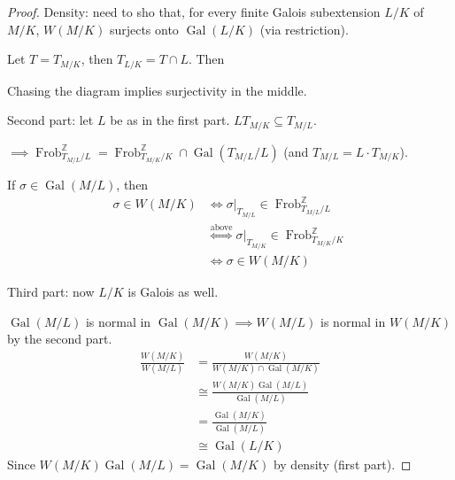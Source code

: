 \documentclass[a4paper]{article}
\theoremstyle{definition}
\theoremstyle{default}
\theoremstyle{remark}
\DeclareMathOperator{\Gal}{Gal}
\DeclareMathOperator{\Frob}{Frob}
\begin{document}
\begin{proof}
	Density: need to sho that,
	for every finite Galois subextension $L/K$ of $M/K$,
	$W(M/K)$ surjects onto $\Gal(L/K)$ (via restriction).
	
	Let $T = T_{M/K}$, then $T_{L/K} = T \cap L$. Then
	\begin{center}
	\end{center}
	Chasing the diagram implies surjectivity in the middle.
	
	Second part: let $L$ be as in the first part.
	$L T_{M/K} \subseteq T_{M/L}$.
	
	\begin{center}
	\end{center}
	$\implies \Frob^\mathbb{Z}_{T_{M/L}/L} = \Frob^\mathbb{Z}_{T_{M/K}/K} \cap \Gal(T_{M/L}/L)$
	(and $T_{M/L} = L\cdot T_{M/K}$).
	
	If $\sigma \in \Gal(M/L)$, then
	\begin{align*}
		\sigma \in W(M/K) &\iff \sigma|_{T_{M/L}} \in \Frob_{T_{M/L}/L}^\mathbb{Z} \\
		&\overset{\text{above}}{\iff} \sigma|_{T_{M/K}} \in \Frob_{T_{M/K}/K}^\mathbb{Z} \\
		&\iff \sigma \in W(M/K)
	\end{align*}
	
	Third part: now $L/K$ is Galois as well.
	
	$\Gal(M/L)$ is normal in $\Gal(M/K) \implies W(M/L)$ is normal in $W(M/K)$ by the second part.
	\begin{align*}
	\frac{W(M/K)}{W(M/L)} &= \frac{W(M/K)}{W(M/K)\cap\Gal(M/K)} \\
	&\cong \frac{W(M/K)\Gal(M/L)}{\Gal(M/L)} \\
	&= \frac{\Gal(M/K)}{\Gal(M/L)} \\
	&\cong \Gal(L/K)
	\end{align*}
	Since $W(M/K)\Gal(M/L) = \Gal(M/K)$ by density (first part).
\end{proof}
\end{document}
